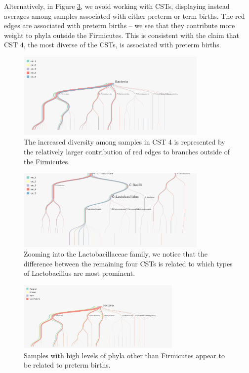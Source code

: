 \documentclass[12pt]{article}
\begin{document}
Alternatively, in Figure \ref{fig:pretermpreterm}, we avoid working with
CSTs, displaying instead averages among samples associated with either
preterm or term births. The red edges are associated with preterm
births -- we see that they contribute more weight to phyla outside the
Firmicutes. This is consistent with the claim that CST 4, the most
diverse of the CSTs, is associated with preterm births.

\begin{figure}

{\centering \includegraphics[width=350px]{figure/preterm_csts}

}

\caption{The increased diversity among samples in CST 4 is represented by the relatively larger contribution of red edges to branches outside of the Firmicutes.}\label{fig:pretermcsts}
\end{figure}

\begin{figure}

{\centering \includegraphics[width=350px]{figure/preterm_csts_lacto}

}

\caption{Zooming into the Lactobacillaceae family, we notice that the difference between the remaining four CSTs is related to which types of Lactobacillus are most prominent.}\label{fig:pretermcstslacto}
\end{figure}

\begin{figure}

{\centering \includegraphics[width=300px]{figure/preterm_preterm}

}

\caption{Samples with high levels of phyla other than Firmicutes appear to be related to preterm births.}\label{fig:pretermpreterm}
\end{figure}
\end{document}
